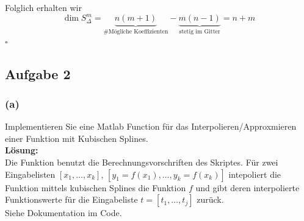 \documentclass[11pt,a4paper,ngerman]{article}
\begin{document}
Folglich erhalten wir
\begin{equation*}
    \dim S_\Delta^m = \underbrace{n(m+1)}_\text{\#Mögliche Koeffizienten} - \underbrace{m(n-1)}_\text{stetig im Gitter} = n + m
\end{equation*}
\mbox{}\hfill$\square$

\subsection*{Aufgabe 2}

\subsubsection*{(a)}

Implementieren Sie eine Matlab Function für das Interpolieren/Approxmieren einer Funktion mit Kubischen Splines.\\

\textbf{Lösung:}\\
Die Funktion benutzt die Berechnungsvorschriften des Skriptes.
Für zwei Eingabelisten $[x_1,\ldots,x_k]$, $[y_1 = f(x_1),\ldots,y_k = f(x_k)]$ 
intepoliert die Funktion mittels kubischen Splines die Funktion $f$ und gibt
deren interpolierte Funktionswerte für die Eingabeliste $t = [t_1, \ldots, t_j]$
zurück. \\
Siehe Dokumentation im Code.
\end{document}

